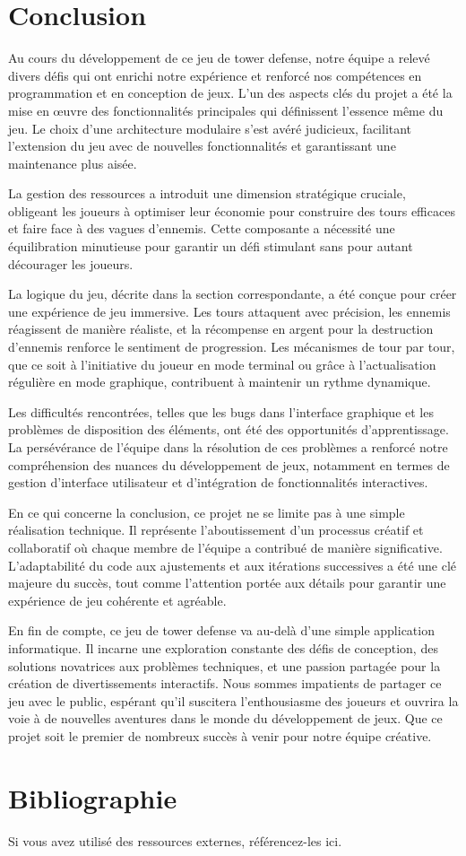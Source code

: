 \documentclass{article}
\begin{document}
\newpage
\section{Conclusion}
Au cours du développement de ce jeu de tower defense, notre équipe a relevé divers défis qui ont enrichi notre expérience et renforcé nos compétences en programmation et en conception de jeux. L'un des aspects clés du projet a été la mise en œuvre des fonctionnalités principales qui définissent l'essence même du jeu. Le choix d'une architecture modulaire s'est avéré judicieux, facilitant l'extension du jeu avec de nouvelles fonctionnalités et garantissant une maintenance plus aisée.

La gestion des ressources a introduit une dimension stratégique cruciale, obligeant les joueurs à optimiser leur économie pour construire des tours efficaces et faire face à des vagues d'ennemis. Cette composante a nécessité une équilibration minutieuse pour garantir un défi stimulant sans pour autant décourager les joueurs.

La logique du jeu, décrite dans la section correspondante, a été conçue pour créer une expérience de jeu immersive. Les tours attaquent avec précision, les ennemis réagissent de manière réaliste, et la récompense en argent pour la destruction d'ennemis renforce le sentiment de progression. Les mécanismes de tour par tour, que ce soit à l'initiative du joueur en mode terminal ou grâce à l'actualisation régulière en mode graphique, contribuent à maintenir un rythme dynamique.

Les difficultés rencontrées, telles que les bugs dans l'interface graphique et les problèmes de disposition des éléments, ont été des opportunités d'apprentissage. La persévérance de l'équipe dans la résolution de ces problèmes a renforcé notre compréhension des nuances du développement de jeux, notamment en termes de gestion d'interface utilisateur et d'intégration de fonctionnalités interactives.

En ce qui concerne la conclusion, ce projet ne se limite pas à une simple réalisation technique. Il représente l'aboutissement d'un processus créatif et collaboratif où chaque membre de l'équipe a contribué de manière significative. L'adaptabilité du code aux ajustements et aux itérations successives a été une clé majeure du succès, tout comme l'attention portée aux détails pour garantir une expérience de jeu cohérente et agréable.

En fin de compte, ce jeu de tower defense va au-delà d'une simple application informatique. Il incarne une exploration constante des défis de conception, des solutions novatrices aux problèmes techniques, et une passion partagée pour la création de divertissements interactifs. Nous sommes impatients de partager ce jeu avec le public, espérant qu'il suscitera l'enthousiasme des joueurs et ouvrira la voie à de nouvelles aventures dans le monde du développement de jeux. Que ce projet soit le premier de nombreux succès à venir pour notre équipe créative.

\section*{Bibliographie}
Si vous avez utilisé des ressources externes, référencez-les ici.
\end{document}
